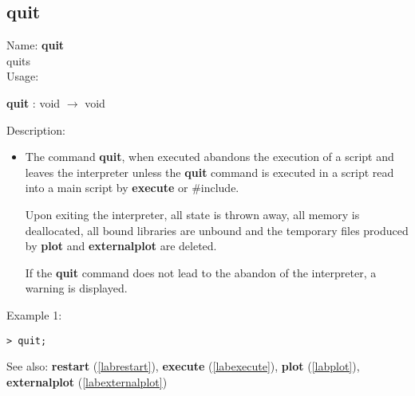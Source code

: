 \subsection{quit}
\label{labquit}
\noindent Name: \textbf{quit}\\
quits \sollya\\
\noindent Usage: 
\begin{center}
\textbf{quit} : \textsf{void} $\rightarrow$ \textsf{void}
\end{center}
\noindent Description: \begin{itemize}

\item The command \textbf{quit}, when executed abandons the execution of a \sollya
   script and leaves the \sollya interpreter unless the \textbf{quit} command 
   is executed in a \sollya script read into a main \sollya script by
   \textbf{execute} or $\#$include.
    
   Upon exiting the \sollya interpreter, all state is thrown away, all
   memory is deallocated, all bound libraries are unbound and the
   temporary files produced by \textbf{plot} and \textbf{externalplot} are deleted.
    
   If the \textbf{quit} command does not lead to the abandon of the \sollya
   interpreter, a warning is displayed.
\end{itemize}
\noindent Example 1: 
\begin{center}\begin{minipage}{15cm}\begin{Verbatim}[frame=single]
> quit;
\end{Verbatim}
\end{minipage}\end{center}
See also: \textbf{restart} (\ref{labrestart}), \textbf{execute} (\ref{labexecute}), \textbf{plot} (\ref{labplot}), \textbf{externalplot} (\ref{labexternalplot})
